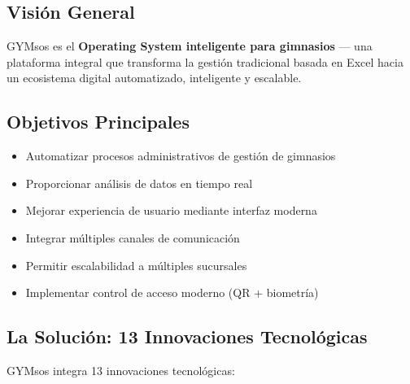 \documentclass[11pt,a4paper]{article}
\begin{document}
\subsection*{Visión General}

GYMsos es el \textbf{Operating System inteligente para gimnasios} — una plataforma integral que transforma la gestión tradicional basada en Excel hacia un ecosistema digital automatizado, inteligente y escalable.

\subsection*{Objetivos Principales}

\begin{itemize}
    \item Automatizar procesos administrativos de gestión de gimnasios
    \item Proporcionar análisis de datos en tiempo real
    \item Mejorar experiencia de usuario mediante interfaz moderna
    \item Integrar múltiples canales de comunicación
    \item Permitir escalabilidad a múltiples sucursales
    \item Implementar control de acceso moderno (QR + biometría)
\end{itemize}

\subsection*{La Solución: 13 Innovaciones Tecnológicas}

GYMsos integra 13 innovaciones tecnológicas:
\end{document}
